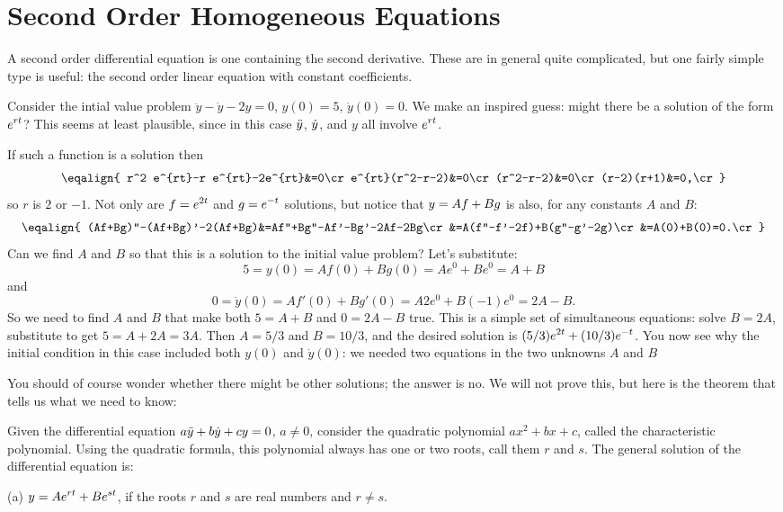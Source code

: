 \section{Second Order Homogeneous Equations}{}{}
\nobreak
A second order differential equation is one containing the second
derivative. These are in general quite complicated, but one fairly
simple type is useful: the second order linear equation with constant
coefficients. 

\example Consider the intial value problem $\ddot y-\dot y-2y=0$,
$y(0)=5$, $\dot y(0)=0$. We make an inspired guess: might there be a
solution of the form $\displaystyle e^{rt}$? This seems at least plausible,
since in this case $\displaystyle\ddot y$, $\displaystyle\dot y$, and $y$ all
involve $\displaystyle e^{rt}$. 

If such a function is a solution then
$$\eqalign{
r^2 e^{rt}-r e^{rt}-2e^{rt}&=0\cr
e^{rt}(r^2-r-2)&=0\cr
(r^2-r-2)&=0\cr
(r-2)(r+1)&=0,\cr}
$$
so $r$ is $2$ or $-1$. Not only are $\displaystyle f=e^{2t}$ and $\displaystyle g=e^{-t}$
solutions, but notice that $\displaystyle y=Af+Bg$ is also, for any constants $A$
and $B$:
$$\eqalign{
(Af+Bg)''-(Af+Bg)'-2(Af+Bg)&=Af''+Bg''-Af'-Bg'-2Af-2Bg\cr
&=A(f''-f'-2f)+B(g''-g'-2g)\cr
&=A(0)+B(0)=0.\cr}
$$
Can we find $A$ and $B$ so that this is a solution to the initial
value problem? Let's substitute:
$$
5=y(0)=Af(0)+Bg(0)=Ae^0+Be^0=A+B
$$
and 
$$0=\dot y(0)=Af'(0)+Bg'(0)=A2e^{0}+B(-1)e^0=2A-B.$$
So we need to find $A$ and $B$ that make both $5=A+B$ and $0=2A-B$
true. This is a simple set of simultaneous equations: solve $B=2A$,
substitute to get $5=A+2A=3A$. Then $A=5/3$ and $B=10/3$, and the
desired solution is $\displaystyle (5/3)e^{2t}+(10/3)e^{-t}$. You now see why
the initial condition in this case included both $y(0)$ and $\dot
y(0)$: we needed two equations in the two unknowns $A$ and $B$
\endexample

You should of course wonder whether there might be other solutions;
the answer is no. We will not prove this, but here is the theorem that
tells us what we need to know:

\thm Given 
the differential equation $\displaystyle a\ddot y+b\dot y+cy=0$, $a\not=0$,
consider the quadratic polynomial $ax^2+bx+c$, called the
     {\dfont characteristic polynomial}. Using the quadratic formula, this polynomial
     always has one or two roots, call them $r$ and $s$.  The general
     solution of the differential equation is:

\beginlist
\item{(a)} $\displaystyle y=Ae^{rt}+Be^{st}$, if the roots $r$ and $s$ are real
  numbers and $r\not=s$.

